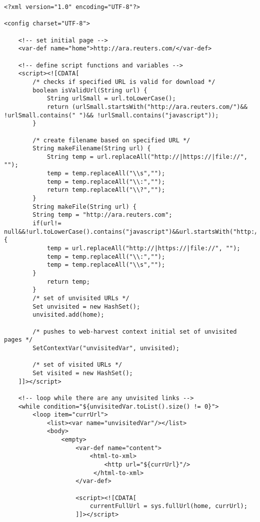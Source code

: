\begin{lstlisting}
<?xml version="1.0" encoding="UTF-8"?>

<config charset="UTF-8">

    <!-- set initial page -->
    <var-def name="home">http://ara.reuters.com/</var-def>

    <!-- define script functions and variables -->
    <script><![CDATA[
        /* checks if specified URL is valid for download */
        boolean isValidUrl(String url) {
            String urlSmall = url.toLowerCase();
            return (urlSmall.startsWith("http://ara.reuters.com/")&& !urlSmall.contains(" ")&& !urlSmall.contains("javascript"));
        }

        /* create filename based on specified URL */
        String makeFilename(String url) {
        	String temp = url.replaceAll("http://|https://|file://", "");
        	temp = temp.replaceAll("\\s","");
        	temp = temp.replaceAll("\\:","");
           	return temp.replaceAll("\\?","");
        }
		String makeFile(String url) {
		String temp = "http://ara.reuters.com";
		if(url!= null&&!url.toLowerCase().contains("javascript")&&url.startsWith("http://ara.reuters.com/")){
			temp = url.replaceAll("http://|https://|file://", "");
			temp = temp.replaceAll("\\:","");
	        temp = temp.replaceAll("\\s","");
		}
	        return temp;
        }
        /* set of unvisited URLs */
        Set unvisited = new HashSet();
        unvisited.add(home);

        /* pushes to web-harvest context initial set of unvisited pages */
        SetContextVar("unvisitedVar", unvisited);

        /* set of visited URLs */
        Set visited = new HashSet();
    ]]></script>

    <!-- loop while there are any unvisited links -->
    <while condition="${unvisitedVar.toList().size() != 0}">
        <loop item="currUrl">
            <list><var name="unvisitedVar"/></list>
            <body>
                <empty>
                    <var-def name="content">
                        <html-to-xml>
                            <http url="${currUrl}"/>
                         </html-to-xml>
                    </var-def>

                    <script><![CDATA[
                        currentFullUrl = sys.fullUrl(home, currUrl);
                    ]]></script>


\end{lstlisting}
